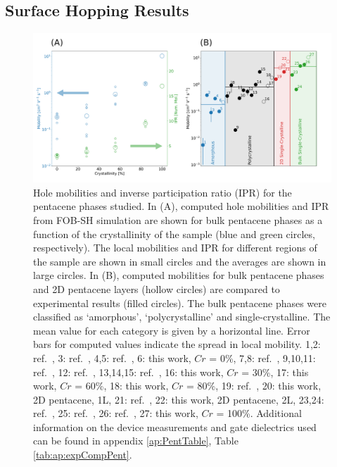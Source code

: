 \subsection{Surface Hopping Results}
\begin{figure}[htp] 
  \includegraphics[width=\textwidth]{../img/DifferentQuenchTimes/mobilities.png}
  \caption{\label{fig:mobilities}Hole mobilities and inverse participation ratio (IPR) for the pentacene phases studied.  
 In (A), computed hole mobilities and IPR from FOB-SH simulation are shown for bulk pentacene phases 
 as a function of the crystallinity of the sample (blue and green circles, respectively). The local mobilities and IPR for different regions of the sample are shown in 
	small circles and the averages are shown in large circles. In (B), computed mobilities for bulk pentacene phases and 2D pentacene layers (hollow circles) 
	are compared to experimental results (filled circles). The bulk pentacene phases were classified as `amorphous', `polycrystalline' and single-crystalline. The mean value for each category is given by a horizontal line.
 Error bars for computed values indicate the spread in local mobility.  
 1,2: ref.~\cite{AmorphPentPumpProbe}, 
 3: ref.~\cite{BAE201398}, 
 4,5: ref.~\cite{AmorphPentTransportDodgy},
 6: this work, $Cr$ = 0\%,
 7,8: ref.~\cite{KNIPP2004595},
 9,10,11: ref.~\cite{Fritz2005},
 12: ref.~\cite{Duffy2008}, 
 13,14,15: ref.~\cite{Klauk02},
 16: this work, $Cr$ = 30\%,
 17: this work, $Cr$ = 60\%,
 18:  this work,  $Cr$ = 80\%,
 19: ref.~\cite{Zhang2016TF},
  20: this work, 2D pentacene, 1L,
 21: ref.~\cite{Zhang2016TF},
 22:  this work, 2D pentacene, 2L,
 23,24: ref.~\cite{Lee2006}, 
 25: ref.~\cite{Takeyama2012_PentCryst},
 26: ref.~\cite{Arabi2016},
 27: this work, $Cr$ = 100\%.  
	Additional information on the device measurements and gate dielectrics used can be found in appendix \ref{ap:PentTable}, Table \ref{tab:ap:expCompPent}.}
\end{figure}
